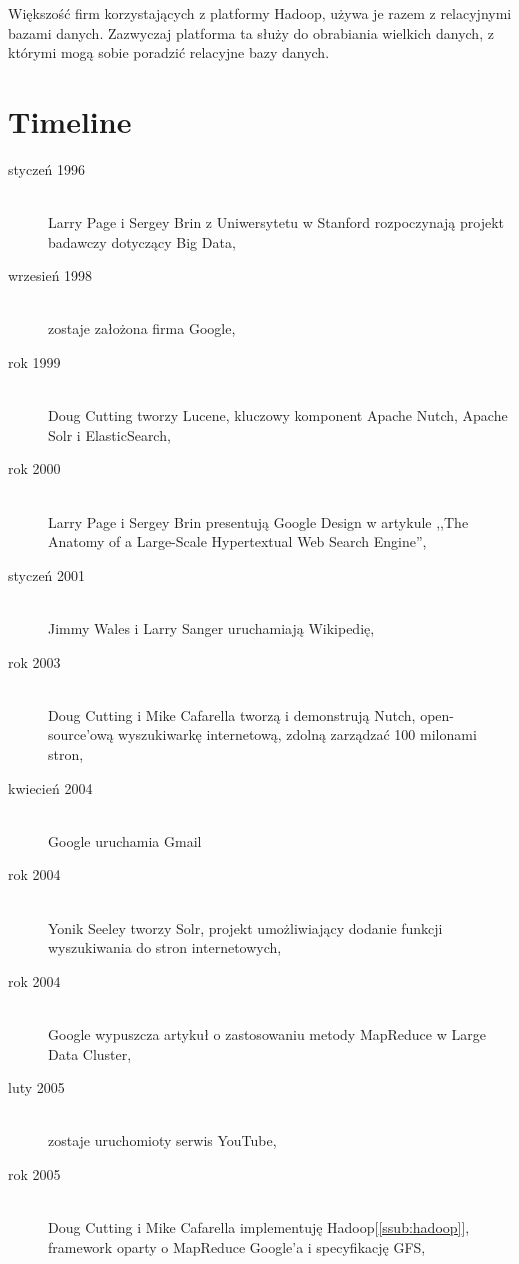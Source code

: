 \documentclass[10pt,twocolumn]{llncs}          %
\begin{document}
Większość firm korzystających z platformy Hadoop, używa je razem z relacyjnymi bazami danych. Zazwyczaj platforma ta służy do obrabiania wielkich danych, z którymi mogą sobie poradzić relacyjne bazy danych.

\section{Timeline}
\label{sub:timeline}
\begin{description}
    \item[styczeń 1996] \hfill \\ Larry Page i Sergey Brin z Uniwersytetu w Stanford rozpoczynają projekt badawczy dotyczący Big Data,
    \item[wrzesień 1998] \hfill \\ zostaje założona firma Google,
    \item[rok 1999] \hfill \\ Doug Cutting tworzy Lucene, kluczowy komponent Apache Nutch, Apache Solr i ElasticSearch,
    \item[rok 2000] \hfill \\ Larry Page i Sergey Brin presentują Google Design w artykule ,,The Anatomy of a Large-Scale Hypertextual Web Search Engine'',
    \item[styczeń 2001] \hfill \\ Jimmy Wales i Larry Sanger uruchamiają Wikipedię,
    \item[rok 2003] \hfill \\ Doug Cutting i Mike Cafarella tworzą i demonstrują Nutch, open-source'ową wyszukiwarkę internetową, zdolną zarządzać 100 milonami stron,
    \item[kwiecień 2004] \hfill \\ Google uruchamia Gmail
    \item[rok 2004] \hfill \\ Yonik Seeley tworzy Solr, projekt umożliwiający dodanie funkcji wyszukiwania do stron internetowych,
    \item[rok 2004] \hfill \\ Google wypuszcza artykuł o zastosowaniu metody MapReduce w Large Data Cluster,
    \item[luty 2005] \hfill \\ zostaje uruchomioty serwis YouTube,
    \item[rok 2005] \hfill \\ Doug Cutting i Mike Cafarella implementuję Hadoop[\ref{ssub:hadoop}], framework oparty o MapReduce Google'a i specyfikację GFS,

\end{description}
\end{document}
